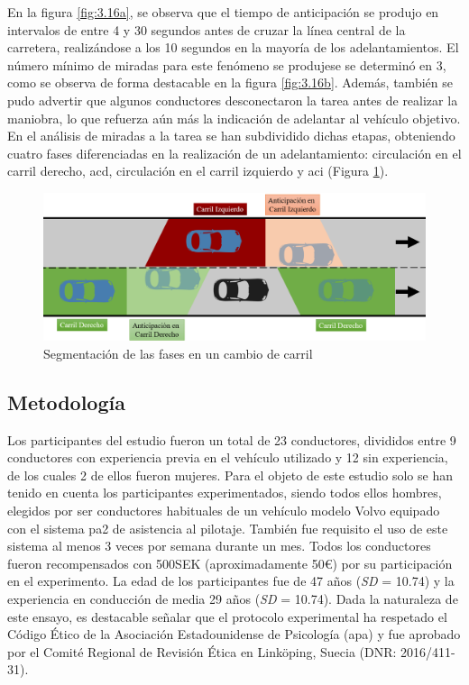 En la figura \ref{fig:3.16a}, se observa que el tiempo de anticipación se produjo en intervalos de entre 4 y 30 segundos antes de cruzar la línea central de la carretera, realizándose a los 10 segundos en la mayoría de los adelantamientos. El número mínimo de miradas para este fenómeno se produjese se determinó en 3, como se observa de forma destacable en la figura \ref{fig:3.16b}. Además, también se pudo advertir que algunos conductores desconectaron la tarea antes de realizar la maniobra, lo que refuerza aún más la indicación de adelantar al vehículo objetivo.
En el análisis de miradas a la tarea se han subdividido dichas etapas, obteniendo cuatro fases diferenciadas en la realización de un adelantamiento: circulación en el carril derecho, \gls{acd}, circulación en el carril izquierdo y \gls{aci} (Figura \ref{fig:3.17}).

\begin{figure}[h]
    \centering
    \includegraphics[width=14cm]
    {figures/3.17.png}
    \caption{ \label{fig:3.17} Segmentación de las fases en un cambio de carril}
\end{figure}

\subsection{Metodología }\label{322}

Los participantes del estudio fueron un total de 23 conductores, divididos entre 9 conductores con experiencia previa en el vehículo utilizado y 12 sin experiencia, de los cuales 2 de ellos fueron mujeres. Para el objeto de este estudio solo se han tenido en cuenta los participantes experimentados, siendo todos ellos hombres, elegidos por ser conductores habituales de un vehículo modelo Volvo equipado con el sistema \gls{pa2} de asistencia al pilotaje. También fue requisito el uso de este sistema al menos 3 veces por semana durante un mes. Todos los conductores fueron recompensados con 500SEK (aproximadamente 50€) por su participación en el experimento. La edad de los participantes fue de 47 años (\emph{SD} = 10.74) y la experiencia en conducción de media 29 años (\emph{SD} = 10.74). Dada la naturaleza de este ensayo, es destacable señalar que el protocolo experimental ha respetado el Código Ético de la Asociación Estadounidense de Psicología (\gls{apa}) y fue aprobado por el Comité Regional de Revisión Ética en Linköping, Suecia (DNR: 2016/411- 31).

